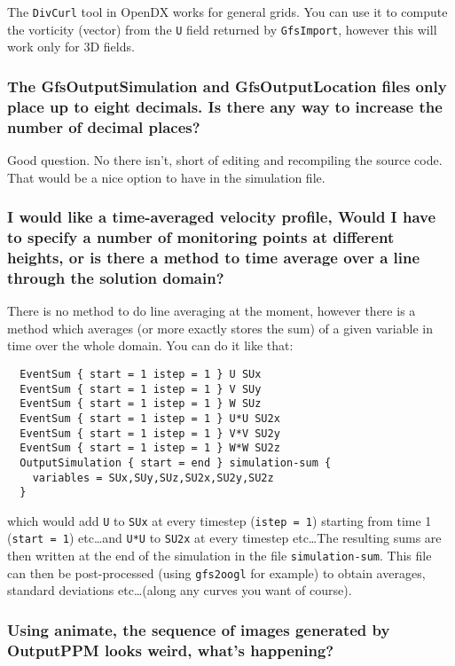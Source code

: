 \documentclass[a4paper]{article}
\begin{document}
The {\tt DivCurl} tool in OpenDX works for general grids. You can use it
to compute the vorticity (vector) from the {\tt U} field returned by
{\tt GfsImport}, however this will work only for 3D fields.

\subsubsection{The GfsOutputSimulation and GfsOutputLocation files only place up
to eight decimals. Is there any way to increase the number of decimal places?}

Good question. No there isn't, short of editing and recompiling the
source code. That would be a nice option to have in the simulation
file.

\subsubsection{I would like a time-averaged velocity profile,
Would I have to specify a number of monitoring points at different heights,  
or is there a method to time average over a line through the solution 
domain?}

There is no method to do line averaging at the moment, however there
is a method which averages (or more exactly stores the sum) of a given
variable in time over the whole domain. You can do it like that:
\begin{verbatim} 
  EventSum { start = 1 istep = 1 } U SUx
  EventSum { start = 1 istep = 1 } V SUy
  EventSum { start = 1 istep = 1 } W SUz
  EventSum { start = 1 istep = 1 } U*U SU2x
  EventSum { start = 1 istep = 1 } V*V SU2y
  EventSum { start = 1 istep = 1 } W*W SU2z
  OutputSimulation { start = end } simulation-sum { 
    variables = SUx,SUy,SUz,SU2x,SU2y,SU2z
  }
\end{verbatim}
which would add {\tt U} to {\tt SUx} at every timestep ({\tt istep = 1}) starting from
time 1 ({\tt start = 1}) etc\dots and {\tt U*U} to {\tt SU2x} at every timestep
etc\dots The resulting sums are then written at the end of the
simulation in the file {\tt simulation-sum}. This file can then be
post-processed (using {\tt gfs2oogl} for example) to obtain averages,
standard deviations etc\dots (along any curves you want of course).

\subsubsection{Using animate, the sequence of images generated by OutputPPM looks weird, what's happening?}
\end{document}
